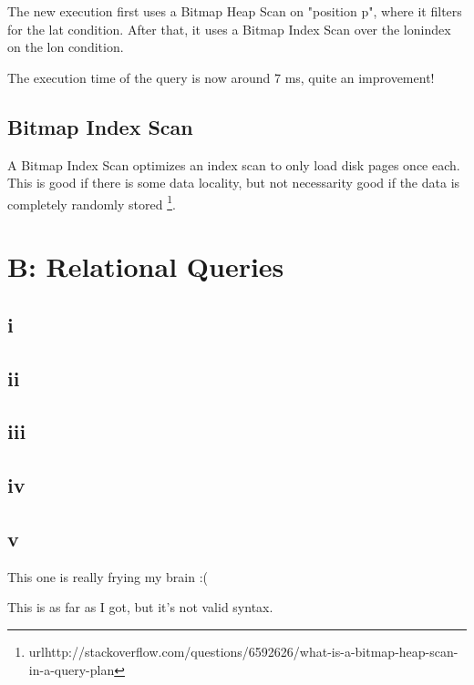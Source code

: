 \documentclass[a4paper]{article}
\begin{document}
The new execution first uses a Bitmap Heap Scan on "position p", where it filters for the lat condition. After that, it uses a Bitmap Index Scan over the lon\textunderscore index on the lon condition.

The execution time of the query is now around 7 ms, quite an improvement!

\subsection{Bitmap Index Scan}

A Bitmap Index Scan optimizes an index scan to only load disk pages once each. This is good if there is some data locality, but not necessarity good if the data is completely randomly stored \footnote{url{http://stackoverflow.com/questions/6592626/what-is-a-bitmap-heap-scan-in-a-query-plan}}.

\section{B: Relational Queries}

\subsection{i}



\subsection{ii}



\subsection{iii}



\subsection{iv}



\subsection{v}

This one is really frying my brain :(

This is as far as I got, but it's not valid syntax.


\end{document}
